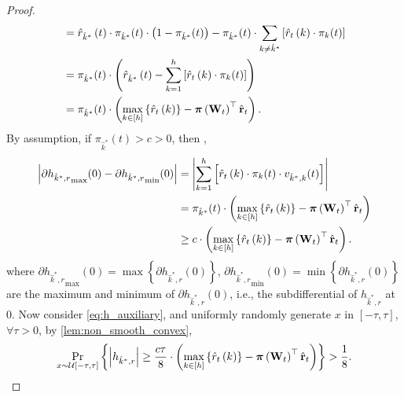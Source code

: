 \begin{proof}
\begin{equation*}
\begin{split}
	&= \hat{r}_{\hat{k}^*}\left(t\right) \cdot \pi_{\hat{k}^*}(t) \cdot \left( 1 - \pi_{\hat{k}^*}(t) \right) - \pi_{\hat{k}^*}(t) \cdot \sum\limits_{k\not=\hat{k}^*}{ \left[ \hat{r}_{t}\left(k\right) \cdot \pi_{k}(t) \right] } \\
	&= \pi_{\hat{k}^*}(t) \cdot \left( \hat{r}_{\hat{k}^*}\left(t\right) - \sum\limits_{k=1}^{h}{ \left[ \hat{r}_{t}\left(k\right) \cdot \pi_{k}(t) \right] } \right) \\
	&= \pi_{\hat{k}^*}(t) \cdot \left( \max\limits_{k \in \left[h\right]}\left\{ \hat{r}_t\left(k\right) \right\} - {\boldsymbol{\pi}}\left( {\mathbf{W}}_t \right)^\top \hat{{\mathbf{r}}}_t  \right).
\end{split}
\end{equation*}
By assumption, if $\pi_{\hat{k}^*}(t) > c > 0$, then ,
\begin{equation*}
\begin{split}
	\left| \partial{h_{\hat{k}^*,r}}_{\max}{(0)} - \partial{h_{\hat{k}^*,r}}_{\min}{(0)} \right| &= \left| \sum\limits_{k=1}^{h}{ \left[  \hat{r}_{t}\left(k\right) \cdot \pi_{k}(t) \cdot v_{\hat{k}^*,k}(t) \right] } \right| \\
	&= \pi_{\hat{k}^*}(t) \cdot \left( \max\limits_{k \in \left[h\right]}\left\{ \hat{r}_t\left(k\right) \right\} - {\boldsymbol{\pi}}\left( {\mathbf{W}}_t \right)^\top \hat{{\mathbf{r}}}_t  \right) \\
	&\ge c \cdot \left( \max\limits_{k \in \left[h\right]}\left\{ \hat{r}_t\left(k\right) \right\} - {\boldsymbol{\pi}}\left( {\mathbf{W}}_t \right)^\top \hat{{\mathbf{r}}}_t  \right).
\end{split}
\end{equation*}
where $\partial{h_{\hat{k}^*,r}}_{\max}{(0)} = \max\left\{ \partial{h_{\hat{k}^*,r}}{(0)} \right\}$, $\partial{h_{\hat{k}^*,r}}_{\min}{(0)} = \min\left\{ \partial{h_{\hat{k}^*,r}}{(0)} \right\}$ are the maximum and minimum of $\partial{h_{\hat{k}^*,r}}{(0)}$, i.e., the subdifferential of $h_{\hat{k}^*,r}$ at $0$. Now consider \cref{eq:h_auxiliary}, and uniformly randomly generate $x$ in $\left[ -\tau, \tau \right]$, $\forall \tau > 0$, by \cref{lem:non_smooth_convex},
\begin{equation}
\label{eq:h_regret_lower_bound}
\begin{split}
	\operatorname*{Pr}\limits_{x \sim  {\mathcal{U}}[-\tau, \tau]}\left\{ \left|  h_{\hat{k}^*,r} \right| \ge \frac{c\tau}{8} \cdot \left( \max\limits_{k \in \left[h\right]}\left\{ \hat{r}_t\left(k\right) \right\} - {\boldsymbol{\pi}}\left( {\mathbf{W}}_t \right)^\top \hat{{\mathbf{r}}}_t  \right) \right\} > \frac{1}{8}.
\end{split}
\end{equation}

\end{proof}
